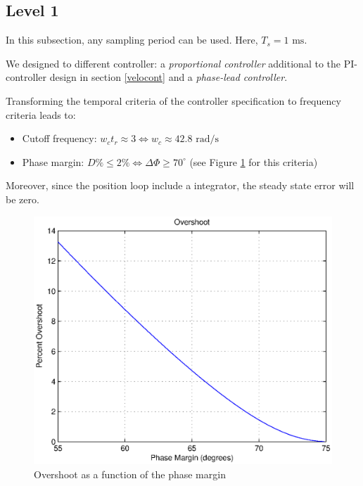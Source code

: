 \subsection*{Level 1}

In this subsection, any sampling period can be used. Here, $T_s = 1 \text{ ms}$.

We designed to different controller: a \emph{proportional controller} additional to the PI-controller design in section \ref{velocont} and a \emph{phase-lead controller}.

Transforming the temporal criteria of the controller specification to frequency criteria leads to:
\begin{itemize}
 \item Cutoff frequency: $w_c t_r \approx 3 \Leftrightarrow w_c \approx 42.8 \text{ rad/s}$
 \item Phase margin: $D\% \leq 2\% \Leftrightarrow \Delta \Phi \geq 70^{\circ}$ (see Figure \ref{overshootMargin} for this criteria)
\end{itemize}

Moreover, since the position loop include a integrator, the steady state error will be zero.

\begin{center}
\begin{figure}[ht]
 \includegraphics[width=\linewidth]{fig/overshootMargin.eps}
 \caption{Overshoot as a function of the phase margin}
 \label{overshootMargin}
\end{figure}
\end{center}

